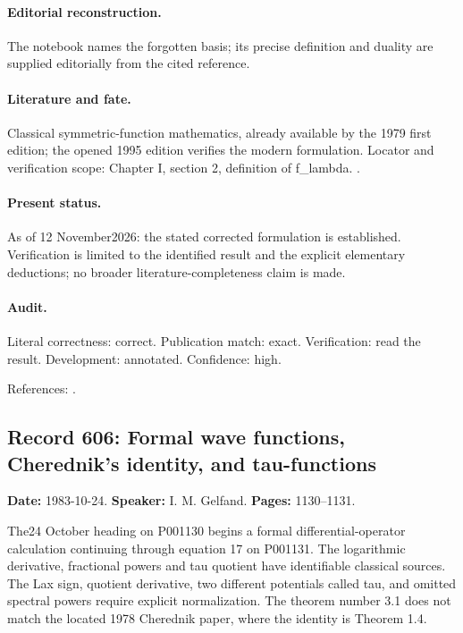 \paragraph{Editorial reconstruction.} The notebook names the forgotten basis; its precise definition and duality are supplied editorially from the cited reference.

\paragraph{Literature and fate.} Classical symmetric-function mathematics, already available by the 1979 first edition; the opened 1995 edition verifies the modern formulation. Locator and verification scope: Chapter I, section 2, definition of f_lambda. \cite{macdonald1995symmetric}.

\paragraph{Present status.} As of 12 November2026: the stated corrected formulation is established. Verification is limited to the identified result and the explicit elementary deductions; no broader literature-completeness claim is made.

\paragraph{Audit.} Literal correctness: correct. Publication match: exact. Verification: read the result. Development: annotated. Confidence: high.

\noindent References: \citep{macdonald1995symmetric}.\par

\subsection{Record 606: Formal wave functions, Cherednik's identity, and tau-functions}

\label{talk:606}

\noindent\textbf{Date:} 1983-10-24. \textbf{Speaker:} I. M. Gelfand. \textbf{Pages:} 1130--1131.\par

The24 October heading on P001130 begins a formal differential-operator calculation continuing through equation 17 on P001131. The logarithmic derivative, fractional powers and tau quotient have identifiable classical sources. The Lax sign, quotient derivative, two different potentials called tau, and omitted spectral powers require explicit normalization. The theorem number 3.1 does not match the located 1978 Cherednik paper, where the identity is Theorem 1.4.

